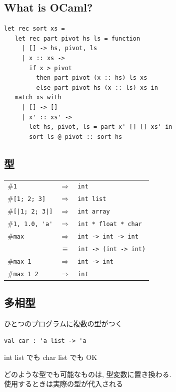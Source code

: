 \documentclass[papersize,30pt,slide]{jsarticle}
\begin{document}
\subsection*{\thesubsection\quad What is OCaml?}
\begin{lstlisting}
let rec sort xs =
   let rec part pivot hs ls = function
     | [] -> hs, pivot, ls
     | x :: xs ->
       if x > pivot
         then part pivot (x :: hs) ls xs
         else part pivot hs (x :: ls) xs in
   match xs with
     | [] -> []
     | x' :: xs' ->
       let hs, pivot, ls = part x' [] [] xs' in
       sort ls @ pivot :: sort hs
\end{lstlisting}


\newpage
\subsection{型}
\begin{tabular}{lcl}
\#\lstinline|1| &$\Longrightarrow$& \lstinline|int|\\
\#\lstinline|[1; 2; 3]| &$\Longrightarrow$& \lstinline|int list|\\
\#\lstinline![|1; 2; 3|]! &$\Longrightarrow$& \lstinline|int array|\\
\#\lstinline|1, 1.0, 'a'| &$\Longrightarrow$& \lstinline|int * float * char| \\
\#\lstinline|max| &$\Longrightarrow$& \lstinline|int -> int -> int|\\
                &$\equiv$& \lstinline|int -> (int -> int)| \\
\#\lstinline|max 1| &$\Longrightarrow$& \lstinline|int -> int|\\
\#\lstinline|max 1 2| &$\Longrightarrow$& \lstinline|int|\\
\end{tabular}

\newpage
\subsection{多相型}
ひとつのプログラムに複数の型がつく

\begin{lstlisting}
val car : 'a list -> 'a
\end{lstlisting}
int list でも char list でも OK

どのような型でも可能なものは, 型変数に置き換わる.\\
使用するときは実際の型が代入される

\vspace{1em}
\end{document}
